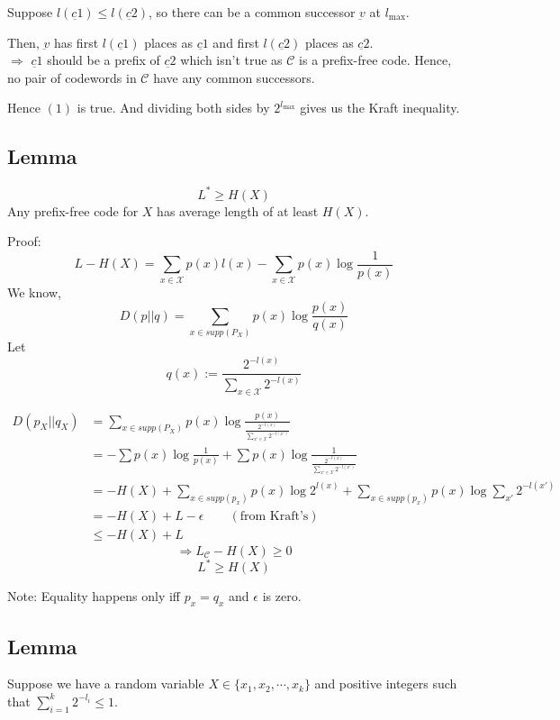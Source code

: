 \documentclass{article}
\begin{document}
Suppose $l(\underbar{c1}) \leq l(\underbar{c2})$, so there can be a common successor $\underbar{v}$ at $l_{\text{max}}$.

Then, $\underbar{v}$ has first $l(\underbar{c1})$ places as $\underbar{c1}$ and first $l(\underbar{c2})$ places as $\underbar{c2}$.\\

$\Rightarrow$ $\underbar{c1}$ should be a prefix of $\underbar{c2}$ which isn't true as $\mathscr{C}$ is a prefix-free code. Hence, no pair of codewords in $\mathscr{C}$ have any common successors.

Hence $(1)$ is true. And dividing both sides by $2^{l_{\text{max}}}$ gives us the Kraft inequality.

\subsection{Lemma}
$$ L^{*} \geq H(X)$$
Any prefix-free code for $X$ has average length of at least $H(X)$.

Proof:
$$ L - H(X) =  \sum_{x \in \mathcal{X}}p(x)l(x) - \sum_{x \in \mathcal{X}} p(x) \log \frac{1}{p(x)}$$
We know,
 $$ D(p||q)= \sum_{x \in supp(P_X)}p(x)\log \frac{p(x)}{q(x)}$$
 Let
$$ q(x):= \frac{2^{-l(x)}}{\sum_{x \in \mathcal{X}} 2^{-l(x)}}   $$

\begin{align*}
    D(p_X || q_X) &= \sum_{x \in supp(P_X)}p(x)\log \frac{p(x)}{\frac{2^{-l(x)}}{\sum_{x' \in \mathcal{X}} 2^{-l(x')}}} \\
    &= - \sum p(x) \log \frac{1}{p(x)} + \sum p(x) \log \frac{1}{\frac{2^{-l(x)}}{\sum_{x' \in \mathcal{X}} 2^{-l(x')}}} \\
    &= -H(X) + \sum_{x \in supp(p_x)} p(x) \log 2^{l(x)} + \sum_{x \in supp(p_x)} p(x) \log \sum_{x'} 2^{-l(x')}  \\
    &= -H(X)+ L - \epsilon \qquad (\text{from Kraft's})\\
    & \leq - H(X)+L
\end{align*}
$$ \Rightarrow L_{\mathscr{C}} - H(X) \geq 0$$
 $$ L^{*} \geq H(X)$$

 Note: Equality happens only iff $p_x = q_x$ and $\epsilon$ is zero.
 \subsection{Lemma}
 Suppose we have a random variable $X \in \{ x_1, x_2, \cdots, x_k\}$ and positive integers such that $\sum_{i=1}^{k} 2^{-l_i} \leq 1$.
\end{document}
